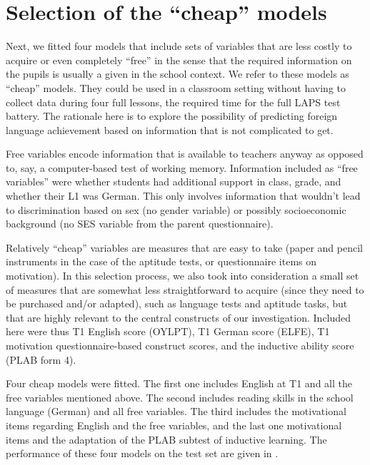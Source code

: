 \documentclass[output=paper]{langsci/langscibook}
\begin{document}
\section{Selection of the ``cheap'' models}

Next, we fitted four models that include sets of variables that are less costly to acquire or even completely ``free'' in the sense that the required information on the pupils is usually a given in the school context. We refer to these models as ``cheap'' models. They could be used in a classroom setting without having to collect data during four full lessons, the required time for the full LAPS test battery. The rationale here is to explore the possibility of predicting foreign language achievement based on information that is not complicated to get. 

Free variables encode information that is available to teachers anyway as opposed to, say, a computer-based test of working memory. Information included as “free variables” were whether students had additional support in class, grade, and whether their L1 was German. This only involves information that wouldn’t lead to discrimination based on sex (no gender variable) or possibly socioeconomic background (no SES variable from the parent questionnaire). 

Relatively ``cheap'' variables are measures that are easy to take (paper and pencil instruments in the case of the aptitude tests, or questionnaire items on motivation). In this selection process, we also took into consideration a small set of measures that are somewhat less straightforward to acquire (since they need to be purchased and/or adapted), such as language tests and aptitude tasks, but that are highly relevant to the central constructs of our investigation. Included here were thus T1 English score (OYLPT), T1 German score (ELFE), T1 motivation questionnaire-based construct scores, and the inductive ability score (PLAB form 4).

Four cheap models were fitted. The first one includes English at T1 and all the free variables mentioned above. The second includes reading skills in the school language (German) and all free variables. The third includes the motivational items regarding English and the free variables, and the last one motivational items and the adaptation of the PLAB subtest of inductive learning. The performance of these four models on the test set are given in . 
\end{document}
